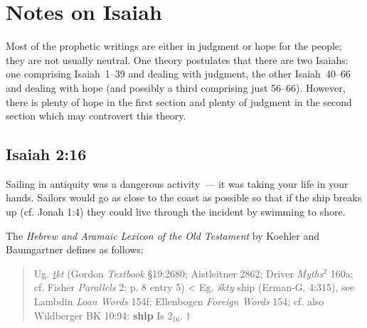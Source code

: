 \chapter{Notes on Isaiah}\label{app:isaiah}
Most of the prophetic writings are either in judgment or hope for the people; they are not usually neutral. One theory postulates that there are two Isaiahs: one comprising Isaiah~1--39 and dealing with judgment, the other Isaiah~40--66 and dealing with hope (and possibly a third comprising just 56--66). However, there is plenty of hope in the first section and plenty of judgment in the second section which may controvert this theory.

\section{Isaiah 2:16}\label{app:isa-2-16}
Sailing in antiquity was a dangerous activity~--- it was taking your life in your hands. Sailors would go as close to the coast as possible so that if the ship breaks up (cf. Jonah 1:4) they could live through the incident by swimming to shore.

The \textit{Hebrew and Aramaic Lexicon of the Old Testament} by Koehler and Baumgartner defines  as follows:
\begin{quote}
    Ug. \textit{\uline{t}kt} (Gordon \textit{Textbook} \S19:2680; Aistleitner 2862; Driver \textit{Myths}$^2$ 160a; cf. Fisher \textit{Parallels} 2: p. 8 entry 5) < Eg. \textit{\'skty} ship (Erman-G. 4:315), see Lambdin \textit{Loan Words} 154f; Ellenbogen \textit{Foreign Words} 154; cf. also Wildberger BK 10:94: \textbf{ship} Is 2$_{16}$. $\dagger$
\end{quote}

